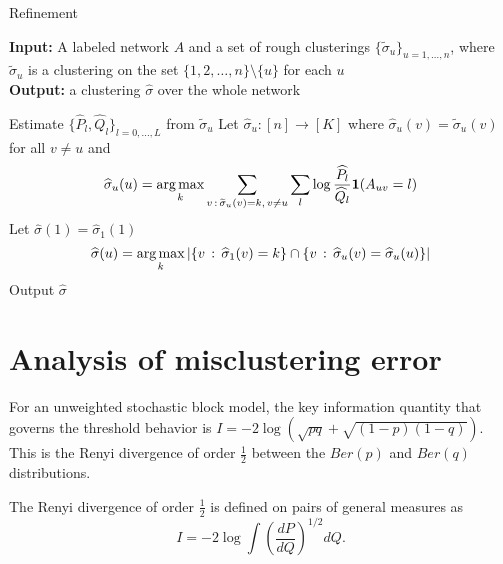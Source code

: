 \documentclass{article}
\begin{document}
\begin{algorithm}
\caption{Refinement}
\label{alg:refinement}
\textbf{Input:} A labeled network $A$ and a set of rough clusterings $\{\tilde{\sigma}_u\}_{u=1, \dots, n}$, where $\tilde \sigma_u$ is a clustering on the set $\{1, 2, \dots, n\} \setminus \{u\}$ for each $u$ \\
\textbf{Output:} a clustering $\hat{\sigma}$ over the whole network

\begin{algorithmic}[1]
   \State Estimate $\{ \hat{P}_l, \hat{Q}_l\}_{l=0,...,L}$ from $\tilde{\sigma}_u$
   \State Let $\hat{\sigma}_u : [n] \rightarrow [K]$ where 
       $\hat{\sigma}_u(v) = \tilde{\sigma}_u(v)$ for all $v \neq u$ and 
   \[
    \widehat{\sigma}_u(u) = \mathop{\text{\rm arg\,max}}_k \sum_{v \,:\, \widetilde{\sigma}_u(v) = k ,\, v\neq u} 
         \sum_l \log \frac{\widehat{P}_l}{\widehat{Q}_l} \mbox{\boldmath $1$}(A_{uv} = l) 
     \]    
\EndFor 
\State Let $\hat{\sigma}(1) = \hat{\sigma}_1(1)$  
\[
\widehat{\sigma}(u) = \mathop{\text{\rm arg\,max}}_k | \{ v \,:\,  \widehat{\sigma}_1(v) = k \} \cap
                                 \{ v \,:\, \widehat{\sigma}_u(v) = \widehat{\sigma}_u(u) \}|
\]
\EndFor
\State Output $\hat{\sigma}$
\end{algorithmic}

\end{algorithm}




\section{Analysis of misclustering error}
\label{sec:rate}

For an unweighted stochastic block model, the key information quantity that governs the threshold behavior is $I = -2 \log (\sqrt{p q} + \sqrt{(1-p)(1-q)})$. This is the Renyi divergence of order $\frac{1}{2}$ between the $Ber(p)$ and $Ber(q)$ distributions. 

The Renyi divergence of order $\frac{1}{2}$ is defined on pairs of general measures as 
\[
I = -2 \log \int \left( \frac{dP}{dQ} \right)^{1/2} dQ.
\]
\end{document}
